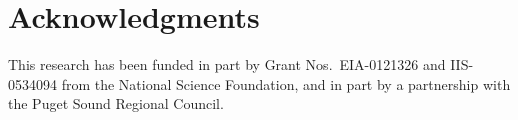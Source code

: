 \documentclass{sig-alternate-preprint}
\begin{document}
\newpage

\section{Acknowledgments}

This research has been funded in part by Grant Nos.\ EIA-0121326 and
IIS-0534094 from the National Science Foundation, and in part by a
partnership with the Puget Sound Regional Council.



%
% 
\end{document}
